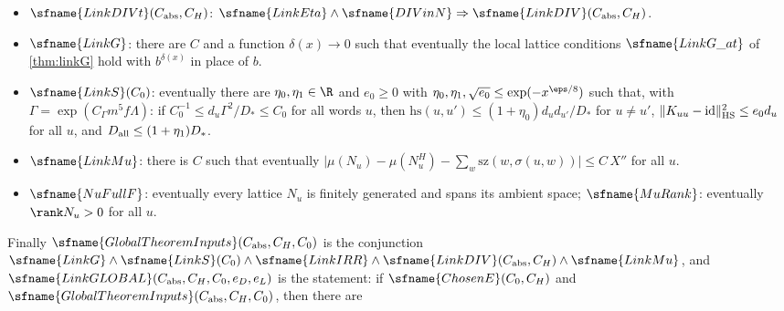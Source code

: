 \begin{definition}[Links]
\begin{itemize}
$g_0$, $g_1$ and $d$, and does not divide $D_\Gamma(u)$, the gain $\mathrm{gain}(j,w)$ and the term $E(u,j,w)$ of
$L$ vanish; (4) the Bessel identity $\sfname{BesselId}(D)$: the functionals $B_u$ are rational (they are the
embeddings of the functionals $B_k(u)$ of the division data), and there is an isometry $V$ of the space
$\mathit{EE}$ such that for every word $u$ there are a scalar $a_u\ne0$ and an isometry $U_u$ of the space of $u$
with $B_u(\varphi,F)=a_u\,\mathrm{bes}_u(U_u\varphi,VF)$ for a fixed pairing $\mathrm{bes}_u$; (5) $\mathit{RR}$
is finitely generated and spans its ambient space; (6) $\mathrm{ht}(B_k(u))\le h(u)$ whenever $B_k(u)\ne0$; (7) for
every $u$,
\[
\mu_{\rm dual}(\mathit{RR})+h(u)-F_o\le\mathrm{MAIN}(u)+C|TT|aL_a+C\,m(B_0+N_c)x^{C_{\rm abs}\eps};
\]
(8) $\bigl|\sum_w\mathrm{sz}(w,E(u,j,w))-\bigl(\sum_{t\in TT}a_T(t)\bigr)\log(g_0g_1)\bigr|\le CB_0$ for all
$u,j$; (9) the quantity $h(u)+\bigl(\sum_ta_T(t)\bigr)\log T_u$ varies with $u$ by at most $C(|TT|aL_a+mB_0)$.
\item $\sfname{LinkDIVt}(C_{\rm abs},C_H)$: $\sfname{LinkEta}\wedge\sfname{DIVinN}\Rightarrow
\sfname{LinkDIV}(C_{\rm abs},C_H)$.
\item $\sfname{LinkG}$: there are $C$ and a function $\delta(x)\to0$ such that eventually the local lattice
conditions $\sfname{LinkG\_at}$ of \cref{thm:linkG} hold with $b^{\delta(x)}$ in place of $b$.
\item $\sfname{LinkS}(C_0)$: eventually there are $\eta_0,\eta_1\in\R$ and $e_0\ge0$ with
$\eta_0,\eta_1,\sqrt{e_0}\le\exp(-x^{\eps/8})$ such that, with $\Gamma=\exp(C_\Gamma m^5f\Lambda)$: if
$C_0^{-1}\le d_u\Gamma^2/D_*\le C_0$ for all words $u$, then $\mathrm{hs}(u,u')\le(1+\eta_0)d_ud_{u'}/D_*$ for
$u\ne u'$, $\|K_{uu}-\mathrm{id}\|_{\rm HS}^2\le e_0d_u$ for all $u$, and $D_{\rm all}\le(1+\eta_1)D_*$.
\item $\sfname{LinkMu}$: there is $C$ such that eventually
$\bigl|\mu(N_u)-\mu(N^H_u)-\sum_w\mathrm{sz}(w,\sigma(u,w))\bigr|\le C\,X''$ for all $u$.
\item $\sfname{NuFullF}$: eventually every lattice $N_u$ is finitely generated and spans its ambient space;
$\sfname{MuRank}$: eventually $\rank N_u>0$ for all $u$.
\end{itemize}
Finally $\sfname{GlobalTheoremInputs}(C_{\rm abs},C_H,C_0)$ is the conjunction
$\sfname{LinkG}\wedge\sfname{LinkS}(C_0)\wedge\sfname{LinkIRR}\wedge\sfname{LinkDIV}(C_{\rm abs},C_H)\wedge
\sfname{LinkMu}$, and $\sfname{LinkGLOBAL}(C_{\rm abs},C_H,C_0,e_D,e_L)$ is the statement: if
$\sfname{ChosenE}(C_0,C_H)$ and $\sfname{GlobalTheoremInputs}(C_{\rm abs},C_H,C_0)$, then there are

\end{definition}

